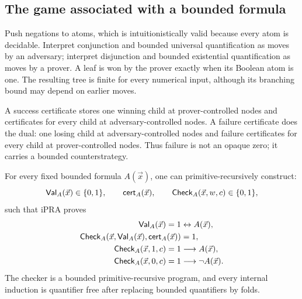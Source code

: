 \subsection{The game associated with a bounded formula}

Push negations to atoms, which is intuitionistically valid because every atom is decidable.  Interpret conjunction and bounded universal quantification as moves by an adversary; interpret disjunction and bounded existential quantification as moves by a prover.  A leaf is won by the prover exactly when its Boolean atom is one.  The resulting tree is finite for every numerical input, although its branching bound may depend on earlier moves.

A success certificate stores one winning child at prover-controlled nodes and certificates for every child at adversary-controlled nodes.  A failure certificate does the dual: one losing child at adversary-controlled nodes and failure certificates for every child at prover-controlled nodes.  Thus failure is not an opaque zero; it carries a bounded counterstrategy.

\begin{theorem}\label{thm:strategy}
For every fixed bounded formula \(A(\vec x)\), one can primitive-recursively construct:
\[
  \mathsf{Val}_A(\vec x)\in\{0,1\},\qquad
  \mathsf{cert}_A(\vec x),\qquad
  \mathsf{Check}_A(\vec x,w,c)\in\{0,1\},
\]
such that iPRA proves
\begin{align*}
 \mathsf{Val}_A(\vec x)=1 &\leftrightarrow A(\vec x),\\
 \mathsf{Check}_A(\vec x,\mathsf{Val}_A(\vec x),\mathsf{cert}_A(\vec x))&=1,\\
 \mathsf{Check}_A(\vec x,1,c)=1&\longrightarrow A(\vec x),\\
 \mathsf{Check}_A(\vec x,0,c)=1&\longrightarrow \neg A(\vec x).
\end{align*}
The checker is a bounded primitive-recursive program, and every internal induction is quantifier free after replacing bounded quantifiers by folds.
\end{theorem}

